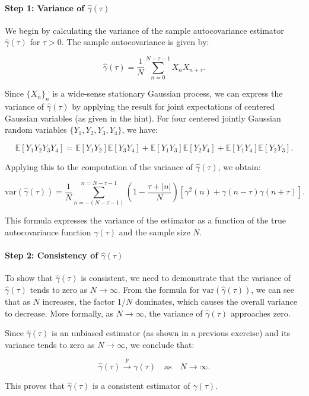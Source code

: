 \documentclass[11pt]{article}
\begin{document}
\begin{solution}

    \paragraph{Step 1: Variance of \(\hat{\gamma}(\tau)\)}
    
    We begin by calculating the variance of the sample autocovariance estimator \(\hat{\gamma}(\tau)\) for \(\tau > 0\). The sample autocovariance is given by:
    
    \[
    \hat{\gamma}(\tau) = \frac{1}{N} \sum_{n=0}^{N-\tau-1} X_n X_{n+\tau}.
    \]
    
    Since \(\{X_n\}_n\) is a wide-sense stationary Gaussian process, we can express the variance of \(\hat{\gamma}(\tau)\) by applying the result for joint expectations of centered Gaussian variables (as given in the hint). For four centered jointly Gaussian random variables \(\{Y_1, Y_2, Y_3, Y_4\}\), we have:
    
    \[
    \mathbb{E}[Y_1 Y_2 Y_3 Y_4] = \mathbb{E}[Y_1 Y_2] \mathbb{E}[Y_3 Y_4] + \mathbb{E}[Y_1 Y_3] \mathbb{E}[Y_2 Y_4] + \mathbb{E}[Y_1 Y_4] \mathbb{E}[Y_2 Y_3].
    \]
    
    Applying this to the computation of the variance of \(\hat{\gamma}(\tau)\), we obtain:
    
    \[
    \text{var}(\hat{\gamma}(\tau)) = \frac{1}{N} \sum_{n=-(N-\tau-1)}^{n=N-\tau-1} \left(1 - \frac{\tau + |n|}{N}\right) \left[\gamma^2(n) + \gamma(n-\tau)\gamma(n+\tau)\right].
    \]
    
    This formula expresses the variance of the estimator as a function of the true autocovariance function \(\gamma(\tau)\) and the sample size \(N\).
    
    \paragraph{Step 2: Consistency of \(\hat{\gamma}(\tau)\)}
    
    To show that \(\hat{\gamma}(\tau)\) is consistent, we need to demonstrate that the variance of \(\hat{\gamma}(\tau)\) tends to zero as \(N \to \infty\). From the formula for \(\text{var}(\hat{\gamma}(\tau))\), we can see that as \(N\) increases, the factor \(1/N\) dominates, which causes the overall variance to decrease. More formally, as \(N \to \infty\), the variance of \(\hat{\gamma}(\tau)\) approaches zero.
    
    Since \(\hat{\gamma}(\tau)\) is an unbiased estimator (as shown in a previous exercise) and its variance tends to zero as \(N \to \infty\), we conclude that:
    
    \[
    \hat{\gamma}(\tau) \xrightarrow{p} \gamma(\tau) \quad \text{as} \quad N \to \infty.
    \]
    
    This proves that \(\hat{\gamma}(\tau)\) is a consistent estimator of \(\gamma(\tau)\).
    
    \end{solution}
    
\end{document}
